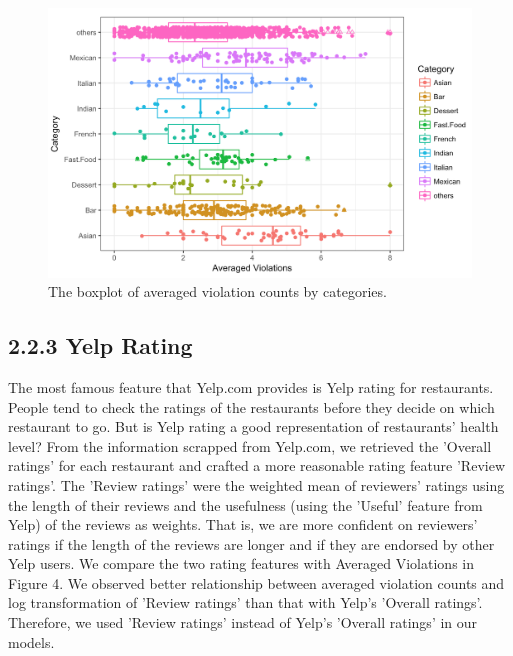 \documentclass[letterpaper, 11 pt, conference]{ieeeconf}
\begin{document}
\begin{figure}[h]
	\centering
    \includegraphics[scale = 0.3]{category}
    \caption{The boxplot of averaged violation counts by categories.}
\end{figure}

\subsection*{2.2.3 Yelp Rating}

The most famous feature that Yelp.com provides is Yelp rating for restaurants. People tend to check the ratings of the restaurants before they decide on which restaurant to go. But is Yelp rating a good representation of restaurants' health level? From the information scrapped from Yelp.com, we retrieved the 'Overall ratings' for each restaurant and crafted a more reasonable rating feature 'Review ratings'. The 'Review ratings' were the weighted mean of reviewers' ratings using the length of their reviews and the usefulness (using the 'Useful' feature from Yelp) of the reviews as weights. That is, we are more confident on reviewers' ratings if the length of the reviews are longer and if they are endorsed by other Yelp users. We compare the two rating features with Averaged Violations in Figure 4. We observed better relationship between averaged violation counts and log transformation of 'Review ratings' than that with Yelp's 'Overall ratings'. Therefore, we used 'Review ratings' instead of Yelp's 'Overall ratings' in our models.
\end{document}
